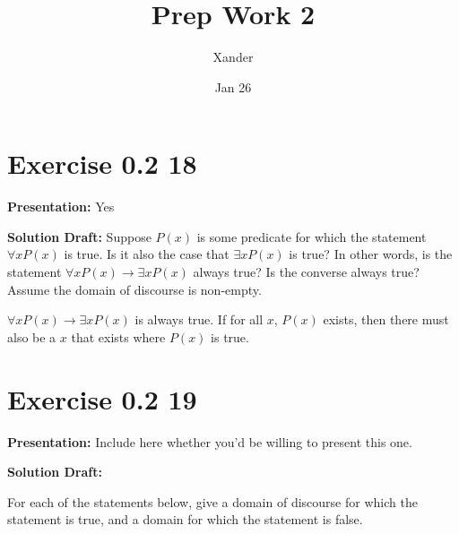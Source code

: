 \documentclass{article}
\title{Prep Work 2}
\author{Xander}
\date{Jan 26}
\begin{document}
\maketitle



\section*{Exercise 0.2 18}  

\noindent\textbf{Presentation:} Yes

\vspace{0.5cm} %


\noindent\textbf{Solution Draft:} 
Suppose $P(x)$ is some predicate for which the statement $\forall xP(x)$ is true. Is it also the case that $\exists xP(x)$ is true? In other words, is the statement $\forall x P(x) \to \exists x P(x)$ always true? Is the converse always true? Assume the domain of discourse is non-empty.

\vspace{0.5cm}

$\forall x P(x) \to \exists x P(x)$ is always true. If for all $x$, $P(x)$ exists, then there must also be a $x$ that exists where $P(x)$ is true.



\section*{Exercise 0.2 19}  

\noindent\textbf{Presentation:} Include here whether you'd be willing to present this one. 

\vspace{0.5cm} %

\noindent\textbf{Solution Draft:} 

For each of the statements below, give a domain of discourse for which the statement is true, and a domain for which the statement is false.
\end{document}
